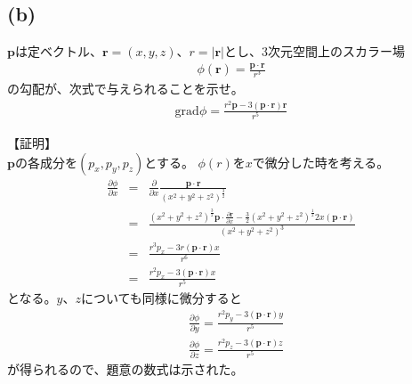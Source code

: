 \documentclass[pdflatex,ja=standard,fleqn]{bxjsarticle}
\begin{document}
\subsection*{(b)}
\begin{screen}
    $\boldsymbol{p}$は定ベクトル、$\boldsymbol{r}=(x,y,z)$、$r=|\boldsymbol{r}|$とし、3次元空間上のスカラー場
\begin{eqnarray*}
    \phi(\boldsymbol{r})=\frac{\boldsymbol{p}\cdot\boldsymbol{r}}{r^3}
\end{eqnarray*}
の勾配が、次式で与えられることを示せ。
\begin{eqnarray*}
    \mathrm{grad}\phi=\frac{r^2\boldsymbol{p}-3(\boldsymbol{p}\cdot\boldsymbol{r})\boldsymbol{r}}{r^5}
\end{eqnarray*}
\end{screen}
【証明】\\
$\boldsymbol{p}$の各成分を$(p_{x},p_{y},p_{z})$とする。
$\phi(r)$を$x$で微分した時を考える。
\begin{eqnarray*}
    \frac{\partial\phi}{\partial x}&=&\frac{\partial}{\partial x}\frac{\boldsymbol{p}\cdot\boldsymbol{r}}{(x^2+y^2+z^2)^{\frac{3}{2}}}\\
    &=&\frac{(x^2+y^2+z^2)^\frac{3}{2}\boldsymbol{p}\cdot\frac{\partial \boldsymbol{r}}{\partial x}-\frac{3}{2}(x^2+y^2+z^2)^{\frac{1}{2}}2x(\boldsymbol{p}\cdot\boldsymbol{r})}{(x^2+y^2+z^2)^3}\\
    &=&\frac{r^3p_{x}-3r(\boldsymbol{p}\cdot\boldsymbol{r})x}{r^6}\\
    &=&\frac{r^2p_{x}-3(\boldsymbol{p}\cdot\boldsymbol{r})x}{r^5}
\end{eqnarray*}
となる。$y$、$z$についても同様に微分すると
\begin{align*}
    &\frac{\partial\phi}{\partial y}=\frac{r^2p_{y}-3(\boldsymbol{p}\cdot\boldsymbol{r})y}{r^5}\\
    &\frac{\partial\phi}{\partial z}=\frac{r^2p_{z}-3(\boldsymbol{p}\cdot\boldsymbol{r})z}{r^5}
\end{align*}
が得られるので、題意の数式は示された。
\end{document}
